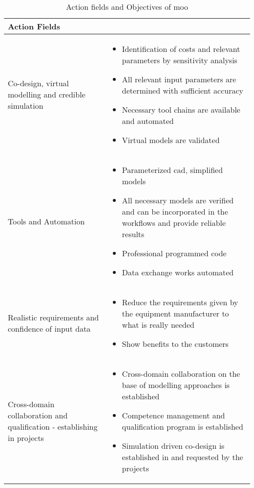 \newpage
\begin{center}
        \begin{table}[h!]
        \begin{tabular}{|>{\centering\arraybackslash}p{2cm}|>{\centering\arraybackslash}p{12cm}|}
        \hline
        \rowcolor{yellow!25} \Large{\textbf{Action Fields}} & \Large{\textbf{\multirow{2}{*}{\centering Objective}}} \\
        \hline
        \centering
		Co-design, virtual modelling and credible simulation & 
        \begin{itemize}
            \item Identification of costs and relevant parameters by sensitivity analysis
            \item All relevant input parameters are determined with sufficient accuracy
            \item Necessary tool chains are available and automated
            \item Virtual models are validated
        \end{itemize}\\
        \hline
        Tools and Automation &
        \begin{itemize}
			\item Parameterized \acrshort{cad}, simplified models
			\item All necessary models are verified and can be incorporated in the workflows and provide reliable results
			\item Professional programmed code
			\item Data exchange works automated
        \end{itemize}\\
		\hline
        Realistic requirements and confidence of input data &
        \begin{itemize}
            \item Reduce the requirements given by the equipment manufacturer to what is really needed
            \item Show benefits to the customers
        \end{itemize}\\
        \hline
        Cross-domain collaboration and qualification - establishing in projects & 
        \begin{itemize}
            \item Cross-domain collaboration on the base of modelling approaches is established
            \item Competence management and qualification program is established
            \item Simulation driven co-design is established in and requested by the projects
        \end{itemize}\\
        \hline
        \end{tabular}
        \caption{Action fields and Objectives of \acrshort{moo}}
        \label{action_field_table}
        \end{table}
\end{center}

